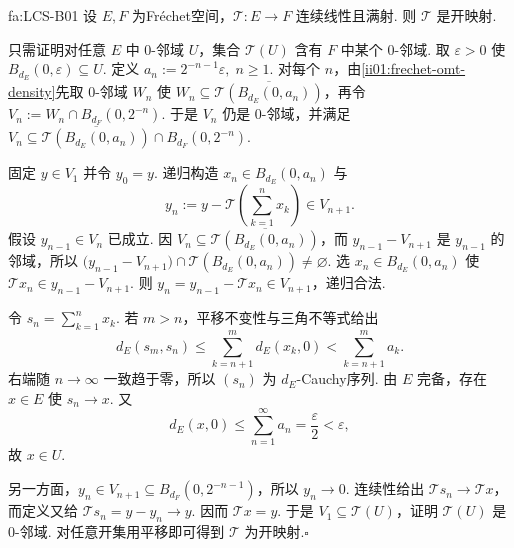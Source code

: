 \begin{FATheorem}[B][Fr\'echet开映射定理]{fa:LCS-B01}
设 \(\displaystyle E,F\) 为Fr\'echet空间，\(\displaystyle \mathcal T:E\to F\) 连续线性且满射. 则 \(\displaystyle \mathcal T\) 是开映射.
\end{FATheorem}

\begin{FAProof}
只需证明对任意 \(\displaystyle E\) 中 \(\displaystyle0\)-邻域 \(\displaystyle U\)，集合 \(\displaystyle \mathcal T(U)\) 含有 \(\displaystyle F\) 中某个 \(\displaystyle0\)-邻域. 取 \(\displaystyle \varepsilon>0\) 使
\(\displaystyle B_{d_E}(0,\varepsilon) \subseteq U.\)
定义
\(\displaystyle a_n:=2^{-n-1}\varepsilon,\; n\geqslant1.\)
对每个 \(\displaystyle n\)，由\autoref{ii01:frechet-omt-density}先取 \(\displaystyle0\)-邻域 \(\displaystyle W_n\) 使 \(\displaystyle W_n\subseteq\overline{\mathcal T(B_{d_E}(0,a_n))}\)，再令
\(\displaystyle V_n := W_n\cap B_{d_F}(0,2^{-n}).\)
于是 \(\displaystyle V_n\) 仍是 \(\displaystyle0\)-邻域，并满足
\(\displaystyle V_n \subseteq \overline{\mathcal T(B_{d_E}(0,a_n))} \cap B_{d_F}(0,2^{-n}).\)

固定 \(\displaystyle y\in V_1\) 并令 \(\displaystyle y_0=y\). 递归构造 \(\displaystyle x_n\in B_{d_E}(0,a_n)\) 与
\[
y_n
:=
y-
\mathcal T\left(\sum_{k=1}^{n}x_k\right)
\in V_{n+1}.
\]
假设 \(\displaystyle y_{n-1}\in V_n\) 已成立. 因 \(\displaystyle V_n\subseteq\overline{\mathcal T(B_{d_E}(0,a_n))}\)，而 \(\displaystyle y_{n-1}-V_{n+1}\) 是 \(\displaystyle y_{n-1}\) 的邻域，所以
\(\displaystyle \bigl(y_{n-1}-V_{n+1}\bigr) \cap \mathcal T(B_{d_E}(0,a_n)) \neq\varnothing.\)
选 \(\displaystyle x_n\in B_{d_E}(0,a_n)\) 使 \(\displaystyle \mathcal Tx_n\in y_{n-1}-V_{n+1}\). 则 \(\displaystyle y_n=y_{n-1}-\mathcal Tx_n\in V_{n+1}\)，递归合法.

令 \(\displaystyle s_n=\sum_{k=1}^{n}x_k\). 若 \(\displaystyle m>n\)，平移不变性与三角不等式给出
\[
d_E(s_m,s_n)
\leqslant
\sum_{k=n+1}^{m}d_E(x_k,0)
<
\sum_{k=n+1}^{m}a_k.
\]
右端随 \(\displaystyle n\to\infty\) 一致趋于零，所以 \(\displaystyle (s_n)\) 为 \(\displaystyle d_E\)-Cauchy序列. 由 \(\displaystyle E\) 完备，存在 \(\displaystyle x\in E\) 使 \(\displaystyle s_n\to x\). 又
\[
d_E(x,0)
\leqslant
\sum_{n=1}^{\infty}a_n
=
\frac{\varepsilon}{2}
<\varepsilon,
\]
故 \(\displaystyle x\in U\).

另一方面，\(\displaystyle y_n\in V_{n+1}\subseteq B_{d_F}(0,2^{-n-1})\)，所以 \(\displaystyle y_n\to0\). 连续性给出 \(\displaystyle \mathcal Ts_n\to\mathcal Tx\)，而定义又给 \(\displaystyle \mathcal Ts_n=y-y_n\to y\). 因而 \(\displaystyle \mathcal Tx=y\). 于是 \(\displaystyle V_1\subseteq\mathcal T(U)\)，证明 \(\displaystyle \mathcal T(U)\) 是 \(\displaystyle0\)-邻域. 对任意开集用平移即可得到 \(\displaystyle \mathcal T\) 为开映射.\hfill\(\square\)
\end{FAProof}

